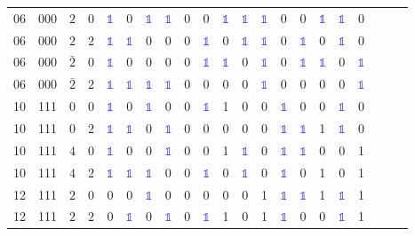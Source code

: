 \begin{longtable*}{c| cccccccccccccccccccc }
06& 000& $2$& $0$& \textcolor{blue}{$\mathds{1}$}& 0& \textcolor{blue}{$\mathds{1}$}& \textcolor{blue}{$\mathds{1}$}& 0& 0& \textcolor{blue}{$\mathds{1}$}& \textcolor{blue}{$\mathds{1}$}& \textcolor{blue}{$\mathds{1}$}& 0& 0& \textcolor{blue}{$\mathds{1}$}& \textcolor{blue}{$\mathds{1}$}& 0\\
06& 000& $2$& $2$& \textcolor{blue}{$\mathds{1}$}& \textcolor{blue}{$\mathds{1}$}& 0& 0& 0& \textcolor{blue}{$\mathds{1}$}& 0& \textcolor{blue}{$\mathds{1}$}& \textcolor{blue}{$\mathds{1}$}& 0& \textcolor{blue}{$\mathds{1}$}& 0& \textcolor{blue}{$\mathds{1}$}& 0\\
06& 000& $\bar{2}$& $0$& \textcolor{blue}{$\mathds{1}$}& 0& 0& 0& 0& \textcolor{blue}{$\mathds{1}$}& \textcolor{blue}{$\mathds{1}$}& 0& \textcolor{blue}{$\mathds{1}$}& 0& \textcolor{blue}{$\mathds{1}$}& \textcolor{blue}{$\mathds{1}$}& 0& \textcolor{blue}{$\mathds{1}$}\\
06& 000& $\bar{2}$& $2$& \textcolor{blue}{$\mathds{1}$}& \textcolor{blue}{$\mathds{1}$}& \textcolor{blue}{$\mathds{1}$}& \textcolor{blue}{$\mathds{1}$}& 0& 0& 0& 0& \textcolor{blue}{$\mathds{1}$}& 0& 0& 0& 0& \textcolor{blue}{$\mathds{1}$}\\
10& 111& $0$& $0$& \textcolor{blue}{$\mathds{1}$}& 0& \textcolor{blue}{$\mathds{1}$}& 0& 0& \textcolor{blue}{$\mathds{1}$}& 1& 0& 0& \textcolor{blue}{$\mathds{1}$}& 0& 0& \textcolor{blue}{$\mathds{1}$}& 0\\
10& 111& $0$& $2$& \textcolor{blue}{$\mathds{1}$}& \textcolor{blue}{$\mathds{1}$}& 0& \textcolor{blue}{$\mathds{1}$}& 0& 0& 0& 0& 0& \textcolor{blue}{$\mathds{1}$}& \textcolor{blue}{$\mathds{1}$}& 1& \textcolor{blue}{$\mathds{1}$}& 0\\
10& 111& $4$& $0$& \textcolor{blue}{$\mathds{1}$}& 0& 0& \textcolor{blue}{$\mathds{1}$}& 0& 0& 1& \textcolor{blue}{$\mathds{1}$}& 0& \textcolor{blue}{$\mathds{1}$}& \textcolor{blue}{$\mathds{1}$}& 0& 0& 1\\
10& 111& $4$& $2$& \textcolor{blue}{$\mathds{1}$}& \textcolor{blue}{$\mathds{1}$}& \textcolor{blue}{$\mathds{1}$}& 0& 0& \textcolor{blue}{$\mathds{1}$}& 0& \textcolor{blue}{$\mathds{1}$}& 0& \textcolor{blue}{$\mathds{1}$}& 0& 1& 0& 1\\
12& 111& $2$& $0$& 0& 0& \textcolor{blue}{$\mathds{1}$}& 0& 0& 0& 0& 0& 1& \textcolor{blue}{$\mathds{1}$}& \textcolor{blue}{$\mathds{1}$}& 1& \textcolor{blue}{$\mathds{1}$}& 1\\
12& 111& $2$& $2$& 0& \textcolor{blue}{$\mathds{1}$}& 0& \textcolor{blue}{$\mathds{1}$}& 0& \textcolor{blue}{$\mathds{1}$}& 1& 0& 1& \textcolor{blue}{$\mathds{1}$}& 0& 0& \textcolor{blue}{$\mathds{1}$}& 1\\

\end{longtable*}
